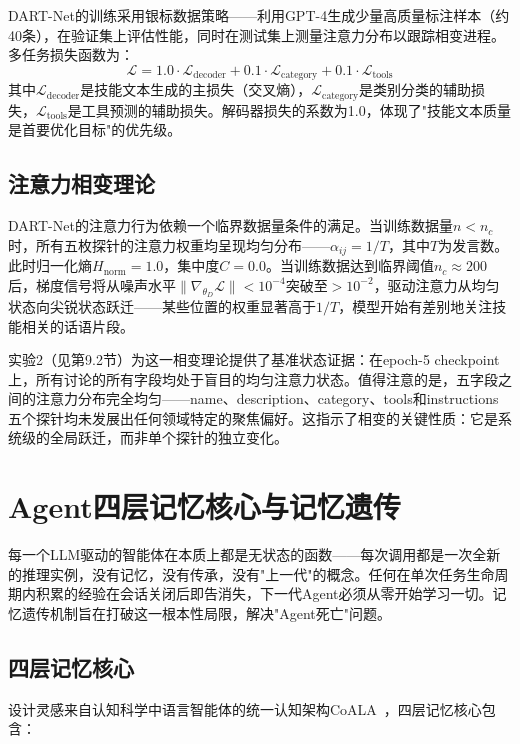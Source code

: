 \documentclass[12pt,a4paper]{ctexart}
\begin{document}
DART-Net的训练采用银标数据策略——利用GPT-4生成少量高质量标注样本（约40条），在验证集上评估性能，同时在测试集上测量注意力分布以跟踪相变进程。多任务损失函数为：
\begin{equation}
\mathcal{L} = 1.0 \cdot \mathcal{L}_{\text{decoder}} + 0.1 \cdot \mathcal{L}_{\text{category}} + 0.1 \cdot \mathcal{L}_{\text{tools}}
\label{eq:loss}
\end{equation}
其中$\mathcal{L}_{\text{decoder}}$是技能文本生成的主损失（交叉熵），$\mathcal{L}_{\text{category}}$是类别分类的辅助损失，$\mathcal{L}_{\text{tools}}$是工具预测的辅助损失。解码器损失的系数为1.0，体现了"技能文本质量是首要优化目标"的优先级。

\subsection{注意力相变理论}

DART-Net的注意力行为依赖一个临界数据量条件的满足。当训练数据量$n < n_c$时，所有五枚探针的注意力权重均呈现均匀分布——$\alpha_{ij} = 1/T$，其中$T$为发言数。此时归一化熵$H_{\text{norm}} = 1.0$，集中度$C = 0.0$。当训练数据达到临界阈值$n_c \approx 200$后，梯度信号将从噪声水平$\|\nabla_{\theta_D} \mathcal{L}\| < 10^{-4}$突破至$> 10^{-2}$，驱动注意力从均匀状态向尖锐状态跃迁——某些位置的权重显著高于$1/T$，模型开始有差别地关注技能相关的话语片段。

实验2（见第9.2节）为这一相变理论提供了基准状态证据：在epoch-5 checkpoint上，所有讨论的所有字段均处于盲目的均匀注意力状态。值得注意的是，五字段之间的注意力分布完全均匀——name、description、category、tools和instructions五个探针均未发展出任何领域特定的聚焦偏好。这指示了相变的关键性质：它是系统级的全局跃迁，而非单个探针的独立变化。

\section{Agent四层记忆核心与记忆遗传}

每一个LLM驱动的智能体在本质上都是无状态的函数——每次调用都是一次全新的推理实例，没有记忆，没有传承，没有"上一代"的概念。任何在单次任务生命周期内积累的经验在会话关闭后即告消失，下一代Agent必须从零开始学习一切。记忆遗传机制旨在打破这一根本性局限，解决"Agent死亡"问题。

\subsection{四层记忆核心}

设计灵感来自认知科学中语言智能体的统一认知架构CoALA~\cite{sumers2023coala}，四层记忆核心包含：
\end{document}
